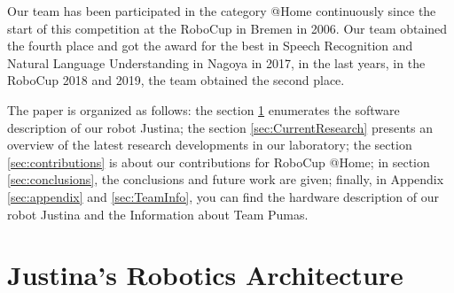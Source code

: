 \documentclass{llncs}
\begin{document}
Our team has been participated in the category @Home continuously since the start of this competition at the RoboCup in Bremen in 2006. Our team obtained the  fourth place and got the award for the best in Speech Recognition and Natural Language Understanding in Nagoya in 2017, in the last years, in the RoboCup 2018 and 2019, the team obtained the second place.

The paper is organized as follows:
the section \ref{sec:background} enumerates the software description of our robot
Justina; the section \ref{sec:CurrentResearch}  presents  an overview of the latest research developments in our laboratory; the section \ref{sec:contributions} is about our contributions for RoboCup @Home;
in section \ref{sec:conclusions}, the conclusions and future work are given;
finally, in Appendix \ref{sec:appendix} and \ref{sec:TeamInfo}, you can find the hardware description of our robot Justina and the Information about Team Pumas.


\section{Justina's Robotics Architecture}\label{sec:background}





\end{document}
